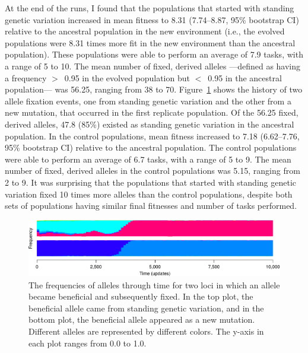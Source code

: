 \begin{doublespace}
At the end of the runs, I found that
the populations that started with standing genetic variation
increased in mean fitness to 8.31 (7.74--8.87, 95\% bootstrap CI)
relative to the ancestral population in the new environment
(i.e., the evolved populations were 8.31 times
more fit in the new environment than the ancestral population).
%
These populations were able to perform
an average of 7.9 tasks, with a range of 5 to 10.
%
The mean number of fixed, derived alleles%
---defined as having a frequency $>$~0.95 in the evolved population
but $<$~0.95 in the ancestral population---%
was 56.25, ranging from 38 to 70.
%
Figure~\ref{allele-freq-plot} shows
the history of two allele fixation events,
one from standing genetic variation and the other from a new mutation,
that occurred in the first replicate population.
%
Of the 56.25 fixed, derived alleles,
47.8 (85\%) existed as standing genetic variation
in the ancestral population.
%
In the control populations, mean fitness increased
to 7.18 (6.62--7.76, 95\% bootstrap CI)
relative to the ancestral population.
%
The control populations were able to perform
an average of 6.7 tasks, with a range of 5 to 9.
%
The mean number of fixed, derived alleles
in the control populations was 5.15, ranging from 2 to 9.
%
It was surprising that the populations
that started with standing genetic variation
fixed 10 times more alleles than the control populations,
despite both sets of populations
having similar final fitnesses and
number of tasks performed.



\begin{figure}
\begin{center}
\includegraphics[width=\linewidth]{allele-freq-plot.pdf}
\caption{The frequencies of alleles through time for two loci
  in which an allele became beneficial and subsequently fixed.
  In the top plot, the beneficial allele came from standing genetic variation,
  and in the bottom plot, the beneficial allele appeared as a new mutation.
  Different alleles are represented by different colors.
  The y-axis in each plot ranges from 0.0 to 1.0.}
\label{allele-freq-plot}
\end{center}
\end{figure}




\end{doublespace}
